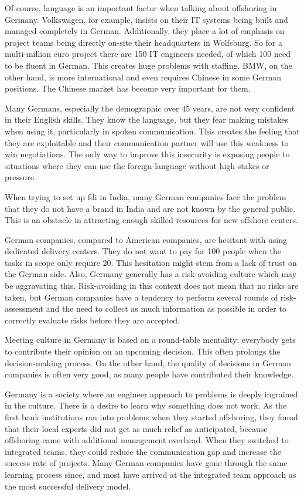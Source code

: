 Of course, language is an important factor when talking about offshoring in Germany. Volkswagen, for example, insists on their IT systems being built and managed completely in German. Additionally, they place a lot of emphasis on project teams being directly on-site their headquarters in Wolfsburg. So for a multi-million euro project there are 150 IT engineers needed, of which 100 need to be fluent in German. This creates huge problems with staffing. BMW, on the other hand, is more international and even requires Chinese in some German positions. The Chinese market has become very important for them.

Many Germans, especially the demographic over 45 years, are not very confident in their English skills. They know the language, but they fear making mistakes when using it, particularly in spoken communication. This creates the feeling that they are exploitable and their communication partner will use this weakness to win negotiations. The only way to improve this insecurity is exposing people to situations where they can use the foreign language without high stakes or pressure.

When trying to set up \gls{fdi} in India, many German companies face the problem that they do not have a brand in India and are not known by the general public. This is an obstacle in attracting enough skilled resources for new offshore centers.

German companies, compared to American companies, are hesitant with using dedicated delivery centers. They do not want to pay for 100 people when the tasks in scope only require 20. This hesitation might stem from a lack of trust on the German side. Also, Germany generally has a risk-avoiding culture which may be aggravating this. Risk-avoiding in this context does not mean that no risks are taken, but German companies have a tendency to perform several rounds of risk-assessment and the need to collect as much information as possible in order to correctly evaluate risks before they are accepted.

Meeting culture in Germany is based on a round-table mentality: everybody gets to contribute their opinion on an upcoming decision. This often prolongs the decision-making process. On the other hand, the quality of decisions in German companies is often very good, as many people have contributed their knowledge.

Germany is a society where an engineer approach to problems is deeply ingrained in the culture. There is a desire to learn why something does not work. As the first bank institutions ran into problems when they started offshoring, they found that their local experts did not get as much relief as anticipated, because offshoring came with additional management overhead. When they switched to integrated teams, they could reduce the communication gap and increase the success rate of projects. Many German companies have gone through the same learning process since, and most have arrived at the integrated team approach as the most successful delivery model.

